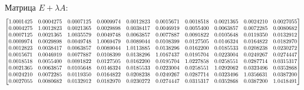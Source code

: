 \documentclass[14pt,a4paper]{scrartcl}
\newcommand\scalemath[2]{\scalebox{#1}{\mbox{\ensuremath{\displaystyle #2}}}}
\begin{document}
Матрица $E + \lambda A$:
\begin{equation*}
\scalemath{0.75}
{
	\begin{bmatrix}{}
	1.0001425 & 0.0004275 & 0.0007125 & 0.0009974 & 0.0012823 & 0.0015671 & 0.0018518 & 0.0021365 & 0.0024210 & 0.0027055 \\ 
	0.0004275 & 1.0012823 & 0.0021365 & 0.0029898 & 0.0038417 & 0.0046919 & 0.0055400 & 0.0063857 & 0.0072285 & 0.0080682 \\ 
	0.0007125 & 0.0021365 & 1.0035579 & 0.0049748 & 0.0063857 & 0.0077887 & 0.0091822 & 0.0105648 & 0.0119350 & 0.0132912 \\ 
	0.0009974 & 0.0029898 & 0.0049748 & 1.0069479 & 0.0089044 & 0.0108399 & 0.0127505 & 0.0146324 & 0.0164822 & 0.0182970 \\ 
	0.0012823 & 0.0038417 & 0.0063857 & 0.0089044 & 1.0113885 & 0.0138296 & 0.0162200 & 0.0185533 & 0.0208238 & 0.0230272 \\ 
	0.0015671 & 0.0046919 & 0.0077887 & 0.0108399 & 0.0138296 & 1.0167437 & 0.0195704 & 0.0223004 & 0.0249267 & 0.0274447 \\ 
	0.0018518 & 0.0055400 & 0.0091822 & 0.0127505 & 0.0162200 & 0.0195704 & 1.0227858 & 0.0258551 & 0.0287714 & 0.0315317 \\ 
	0.0021365 & 0.0063857 & 0.0105648 & 0.0146324 & 0.0185533 & 0.0223004 & 0.0258551 & 1.0292062 & 0.0323496 & 0.0352868 \\ 
	0.0024210 & 0.0072285 & 0.0119350 & 0.0164822 & 0.0208238 & 0.0249267 & 0.0287714 & 0.0323496 & 1.0356631 & 0.0387200 \\ 
	0.0027055 & 0.0080682 & 0.0132912 & 0.0182970 & 0.0230272 & 0.0274447 & 0.0315317 & 0.0352868 & 0.0387200 & 1.0418491 \\ 
	\end{bmatrix}
}
\end{equation*}
\end{document}
